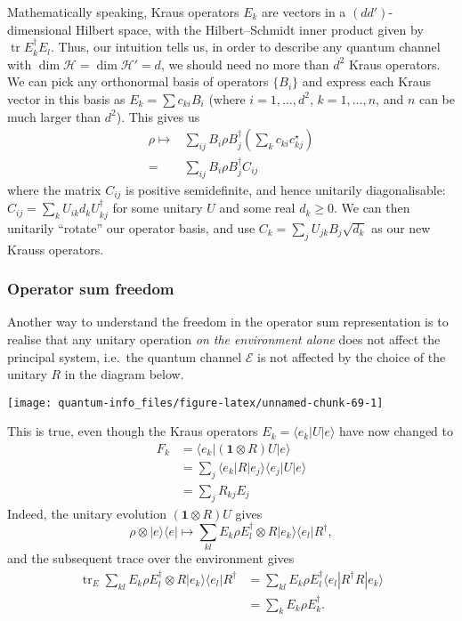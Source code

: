 \documentclass[fleqn]{article}
\begin{document}
Mathematically speaking, Kraus operators \(E_k\) are vectors in a \((dd')\)-dimensional Hilbert space, with the Hilbert--Schmidt inner product given by \(\operatorname{tr}E_k^\dagger E_l\).
Thus, our intuition tells us, in order to describe any quantum channel with \(\dim\mathcal{H}=\dim\mathcal{H}'=d\), we should need no more than \(d^2\) Kraus operators.
We can pick any orthonormal basis of operators \(\{B_i\}\) and express each Kraus vector in this basis as \(E_k=\sum c_{ki} B_i\) (where \(i=1,\ldots,d^2\), \(k=1,\ldots,n\), and \(n\) can be much larger than \(d^2\)).
This gives us
\[
  \begin{aligned}
    \rho
    \longmapsto &\sum_{ij} B_i\rho B^\dagger_j \left(\sum _k c_{ki}c^\star_{kj}\right)
  \\= &\sum_{ij} B_i\rho B^\dagger_j  C_{ij}
  \end{aligned}
\]
where the matrix \(C_{ij}\) is positive semidefinite, and hence unitarily diagonalisable: \(C_{ij}=\sum_k U_{ik} d_k U_{kj}^\dagger\) for some unitary \(U\) and some real \(d_k\geqslant 0\).
We can then unitarily ``rotate'' our operator basis, and use \(C_k=\sum_j U_{jk}B_j \sqrt{d_k}\) as our new Krauss operators.

\hypertarget{operator-sum-freedom}{%
\subsubsection{Operator sum freedom}\label{operator-sum-freedom}}

Another way to understand the freedom in the operator sum representation is to realise that any unitary operation \emph{on the environment alone} does not affect the principal system, i.e.~the quantum channel \(\mathcal{E}\) is not affected by the choice of the unitary \(R\) in the diagram below.

\begin{center}\texttt{[image: quantum-info\_files/figure-latex/unnamed-chunk-69-1]} \end{center}

This is true, even though the Kraus operators \(E_k=\langle e_k|U|e\rangle\) have now changed to
\[
  \begin{aligned}
    F_k
    &= \langle e_k|(\mathbf{1}\otimes R)U|e\rangle
  \\&= \sum_j \langle e_k|R|e_j\rangle\langle e_j|U|e\rangle
  \\&= \sum_j R_{kj}E_j
  \end{aligned}
\]
Indeed, the unitary evolution \((\mathbf{1}\otimes R) U\) gives
\[
  \rho\otimes|e\rangle\langle e|
  \longmapsto \sum_{kl} E_k \rho E_l^\dagger \otimes R|e_k\rangle\langle e_l| R^\dagger,
\]
and the subsequent trace over the environment gives
\[
  \begin{aligned}
    \operatorname{tr}_E \sum_{kl} E_k \rho E_l^\dagger \otimes R|e_k\rangle\langle e_l| R^\dagger
    &= \sum_{kl} E_k \rho E_l^\dagger \langle e_l|R^\dagger R|e_k\rangle
  \\&= \sum_{k} E_k \rho E_k^\dagger.
  \end{aligned}
\]
\end{document}
